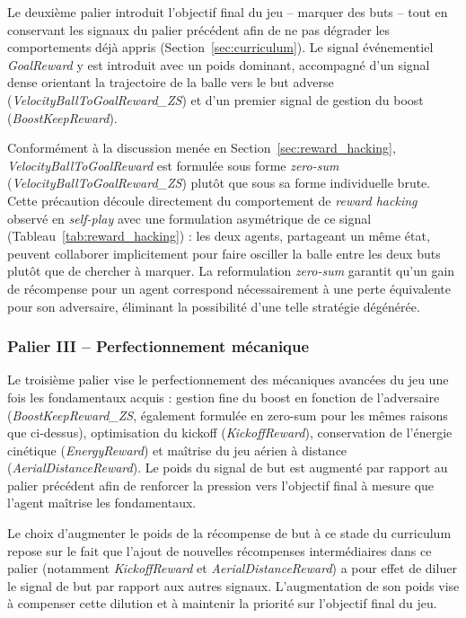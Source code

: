 Le deuxième palier introduit l'objectif final du jeu -- marquer des buts -- tout en conservant les signaux du palier précédent afin de ne pas dégrader les comportements déjà appris (Section~\ref{sec:curriculum}). Le signal événementiel \textit{GoalReward} y est introduit avec un poids dominant, accompagné d'un signal dense orientant la trajectoire de la balle vers le but adverse (\textit{VelocityBallToGoalReward\_ZS}) et d'un premier signal de gestion du boost (\textit{BoostKeepReward}).

Conformément à la discussion menée en Section~\ref{sec:reward_hacking}, \textit{VelocityBallToGoalReward} est formulée sous forme \textit{zero-sum} (\textit{VelocityBallToGoalReward\_ZS}) plutôt que sous sa forme individuelle brute. Cette précaution découle directement du comportement de \textit{reward hacking} observé en \textit{self-play} avec une formulation asymétrique de ce signal (Tableau~\ref{tab:reward_hacking}) : les deux agents, partageant un même état, peuvent collaborer implicitement pour faire osciller la balle entre les deux buts plutôt que de chercher à marquer. La reformulation \textit{zero-sum} garantit qu'un gain de récompense pour un agent correspond nécessairement à une perte équivalente pour son adversaire, éliminant la possibilité d'une telle stratégie dégénérée.

\subsubsection{Palier III -- Perfectionnement mécanique}

Le troisième palier vise le perfectionnement des mécaniques avancées du jeu une fois les fondamentaux acquis : gestion fine du boost en fonction de l'adversaire (\textit{BoostKeepReward\_ZS}, également formulée en zero-sum pour les mêmes raisons que ci-dessus), optimisation du kickoff (\textit{KickoffReward}), conservation de l'énergie cinétique (\textit{EnergyReward}) et maîtrise du jeu aérien à distance (\textit{AerialDistanceReward}). Le poids du signal de but est augmenté par rapport au palier précédent afin de renforcer la pression vers l'objectif final à mesure que l'agent maîtrise les fondamentaux.

Le choix d'augmenter le poids de la récompense de but à ce stade du curriculum repose sur le fait que l'ajout de nouvelles récompenses intermédiaires dans ce palier (notamment \textit{KickoffReward} et \textit{AerialDistanceReward}) a pour effet de diluer le signal de but par rapport aux autres signaux. L'augmentation de son poids vise à compenser cette dilution et à maintenir la priorité sur l'objectif final du jeu.

